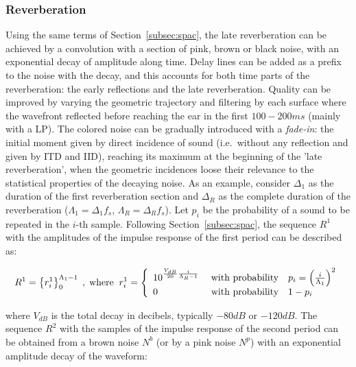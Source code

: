 \subsubsection{Reverberation}\label{subsubsec:reverb}
Using the same terms of Section~\ref{subsec:spac}, the
late reverberation can be achieved by a convolution with a section of pink, brown or black noise, with an exponential decay of amplitude along time. Delay lines can be added as a prefix to the noise
with the decay, and this accounts for both time parts of the reverberation: the early reflections and the late reverberation. Quality can be improved by varying the geometric trajectory and filtering by each surface where the wavefront reflected before reaching the ear in the first $100-200ms$ (mainly with a LP). The colored noise can be gradually introduced with a \emph{fade-in}: the initial moment given by direct
incidence of sound (i.e.\ without any reflection and given by ITD and IID), reaching its maximum at the beginning of the 'late
reverberation', when the geometric incidences loose their relevance to the statistical properties of the decaying noise.
As an example, consider $\Delta_1$ as the duration of the first reverberation section and 
$\Delta_R$ as the complete duration of the reverberation ($\Lambda_1=\Delta_1 f_s$, $\Lambda_R=\Delta_R
f_s$). Let $p_i$ be the probability of a sound to be repeated in the
$i$-th sample.
Following
Section~\ref{subsec:spac}, the sequence $R^1$ with the amplitudes of the
impulse response of the first period can be described as:

\begin{equation}\label{eq:p1rev}
\begin{split}
	R^1  =\left\{r_i^1\right\}_0^{\Lambda_1-1}\;,\; \text{where}\;\;
	r_i^1  =\left\{
        \begin{array}{l l}
            10^{\frac{V_{dB}}{20}\frac{i}{\Lambda_R-1}}\;  & \text{with probability}\quad p_i=\left(\frac{i}{\Lambda_1}\right)^2 \\
                                     0 \; & \text{with probability}\quad 1-p_i \\
        \end{array} \right.
\end{split}
\end{equation}

\noindent where $V_{dB}$ is the total decay in decibels, typically $-80dB$ or $-120dB$.
The sequence $R^2$ with the samples of the impulse response of the second period can be
obtained from a brown noise $N^b$ (or by a pink noise $N^p$) with an exponential amplitude decay of the waveform:

